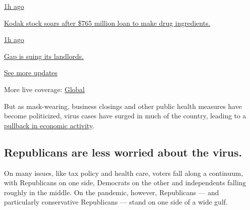 \href{https://www.nytimes.com/live/2020/07/29/business/stock-market-today-coronavirus?action=click\&pgtype=Article\&state=default\&region=MAIN_CONTENT_1\&context=storylines_live_updates\#kodak-stock-soars-after-765-million-loan-to-make-drug-ingredients}{1h
ago}

\href{https://www.nytimes.com/live/2020/07/29/business/stock-market-today-coronavirus?action=click\&pgtype=Article\&state=default\&region=MAIN_CONTENT_1\&context=storylines_live_updates\#kodak-stock-soars-after-765-million-loan-to-make-drug-ingredients}{Kodak
stock soars after \$765 million loan to make drug ingredients.}

\href{https://www.nytimes.com/live/2020/07/29/business/stock-market-today-coronavirus?action=click\&pgtype=Article\&state=default\&region=MAIN_CONTENT_1\&context=storylines_live_updates\#gap-is-suing-its-landlords}{1h
ago}

\href{https://www.nytimes.com/live/2020/07/29/business/stock-market-today-coronavirus?action=click\&pgtype=Article\&state=default\&region=MAIN_CONTENT_1\&context=storylines_live_updates\#gap-is-suing-its-landlords}{Gap
is suing its landlords.}

\href{https://www.nytimes.com/live/2020/07/29/business/stock-market-today-coronavirus?action=click\&pgtype=Article\&state=default\&region=MAIN_CONTENT_1\&context=storylines_live_updates}{See
more updates}

More live coverage:
\href{https://www.nytimes.com/2020/07/29/world/coronavirus-covid-19.html?action=click\&pgtype=Article\&state=default\&region=MAIN_CONTENT_1\&context=storylines_live_updates}{Global}

But as mask-wearing, business closings and other public health measures
have become politicized, virus cases have surged in much of the country,
leading to a
\href{https://www.nytimes.com/2020/07/15/business/economy/economic-recovery-coronavirus-resurgence.html}{pullback
in economic activity}.

\hypertarget{republicans-are-less-worried-about-the-virus}{%
\subsection{Republicans are less worried about the
virus.}\label{republicans-are-less-worried-about-the-virus}}

On many issues, like tax policy and health care, voters fall along a
continuum, with Republicans on one side, Democrats on the other and
independents falling roughly in the middle. On the pandemic, however,
Republicans --- and particularly conservative Republicans --- stand on
one side of a wide gulf.

